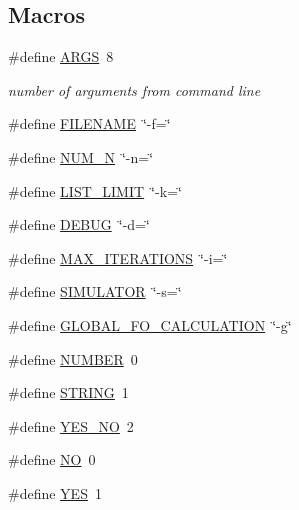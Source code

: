 \subsection*{Macros}
\begin{DoxyCompactItemize}
\item 
\#define \hyperlink{optjrParam__helper_8hh_aff1b09d6630c6c0942f78171e74c1b9d}{A\-R\-G\-S}~8
\begin{DoxyCompactList}\small\item\em number of arguments from command line \end{DoxyCompactList}\item 
\#define \hyperlink{optjrParam__helper_8hh_a8de29f7c8bbf1a81cc6e71ac602032d3}{F\-I\-L\-E\-N\-A\-M\-E}~\char`\"{}-\/f=\char`\"{}
\item 
\#define \hyperlink{optjrParam__helper_8hh_a4f7be859c7225cea6daef529ce8b737a}{N\-U\-M\-\_\-\-N}~\char`\"{}-\/n=\char`\"{}
\item 
\#define \hyperlink{optjrParam__helper_8hh_aaf0b4413f90241f1be4ff1235595706f}{L\-I\-S\-T\-\_\-\-L\-I\-M\-I\-T}~\char`\"{}-\/k=\char`\"{}
\item 
\#define \hyperlink{optjrParam__helper_8hh_ad72dbcf6d0153db1b8d8a58001feed83}{D\-E\-B\-U\-G}~\char`\"{}-\/d=\char`\"{}
\item 
\#define \hyperlink{optjrParam__helper_8hh_a0a3abbca80bc98e7abcb3ae73abe0f14}{M\-A\-X\-\_\-\-I\-T\-E\-R\-A\-T\-I\-O\-N\-S}~\char`\"{}-\/i=\char`\"{}
\item 
\#define \hyperlink{optjrParam__helper_8hh_ad8a5d8c4e3342fb668142df792e93f38}{S\-I\-M\-U\-L\-A\-T\-O\-R}~\char`\"{}-\/s=\char`\"{}
\item 
\#define \hyperlink{optjrParam__helper_8hh_a48549690ff4f612c62edddb87aacc438}{G\-L\-O\-B\-A\-L\-\_\-\-F\-O\-\_\-\-C\-A\-L\-C\-U\-L\-A\-T\-I\-O\-N}~\char`\"{}-\/g\char`\"{}
\item 
\#define \hyperlink{optjrParam__helper_8hh_abc544a4ed22112e62773c113652c5063}{N\-U\-M\-B\-E\-R}~0
\item 
\#define \hyperlink{optjrParam__helper_8hh_a0f4d394a3ab4e09bff60f714c66dc5ee}{S\-T\-R\-I\-N\-G}~1
\item 
\#define \hyperlink{optjrParam__helper_8hh_a0966d7215d44b0eb30c4082965114e45}{Y\-E\-S\-\_\-\-N\-O}~2
\item 
\#define \hyperlink{optjrParam__helper_8hh_a996bde01ecac342918f0a2c4e7ce7bd5}{N\-O}~0
\item 
\#define \hyperlink{optjrParam__helper_8hh_a7ebc9a785e5ab85457c98595aac81589}{Y\-E\-S}~1
\end{DoxyCompactItemize}
